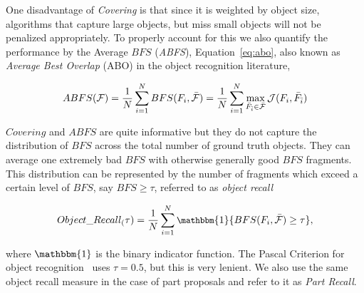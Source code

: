 \noindent
One disadvantage of \emph{Covering} is that since it is weighted by object size, algorithms that capture large objects, but miss small objects will not be penalized appropriately. To properly account for this we also quantify the performance by the Average $BFS$ (\emph{ABFS}), Equation~\ref{eq:abo}, also known as \emph{Average Best Overlap} (ABO) in the object recognition literature,

\begin{equation}
\small
ABFS({\cal F})=\frac{1}{N}\sum_{i=1}^N{BFS(F_{i}, {\cal \bar F})}=\frac{1}{N}\sum_{i=1}^N{\max_{\bar F_{\bar i}\in{\cal \bar F}}{\cal J}(F_i,\bar F_{\bar i})}
\label{eq:abo}
\end{equation}


 
$Covering$ and $ABFS$ are quite informative but they do not capture the distribution of $BFS$ across the total number of ground truth objects. They can average one extremely bad $BFS$ with otherwise generally good $BFS$ fragments. This distribution can be represented by the number of fragments which exceed a certain level of $BFS$, say $BFS \ge \tau$, referred to as \emph{object recall} 



\begin{equation}
\small
Object\_Recall_({\tau})=\frac{1}{N}\sum_{i=1}^N\mathbbm{1}\{BFS(F_{i}, {\cal \bar F})\ge \tau\},
\label{eq:abo_recall}
\end{equation}

\noindent
where $\mathbbm{1}$ is the binary indicator function. The Pascal Criterion for object recognition~\cite{pascal-voc-2007} uses $\tau=0.5$, but this is very lenient. We also use the same object recall measure in the case of part proposals and refer to it as \emph{Part Recall}. 



